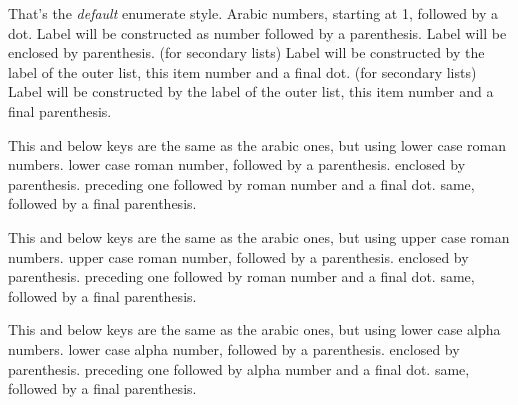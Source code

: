 \documentclass[dctools,english,tocdepth=3,secdepth=3]{ufrgscca} %
\begin{document}
\begin{Keys}


	 That's the \emph{default} enumerate style. Arabic numbers, starting at 1, followed by a dot.
	 Label will be constructed as number followed by a parenthesis.
	 Label will be enclosed by parenthesis.
	 (for secondary lists) Label will be constructed by the label of the outer list, this item number and a final dot.
	 (for secondary lists) Label will be constructed by the label of the outer list, this item number and a final parenthesis.

	 This and below keys are the same as the arabic ones, but using lower case roman numbers.
	 lower case roman number, followed by a parenthesis.
	 enclosed by parenthesis.
	 preceding one followed by roman number and a final dot.
	 same, followed by a final parenthesis.

	 This and below keys are the same as the arabic ones, but using upper case roman numbers.
	 upper case roman number, followed by a parenthesis.
	 enclosed by parenthesis.
	 preceding one followed by roman number and a final dot.
	 same, followed by a final parenthesis.

	 This and below keys are the same as the arabic ones, but using lower case alpha numbers.
	 lower case alpha number, followed by a parenthesis.
	 enclosed by parenthesis.
	 preceding one followed by alpha number and a final dot.
	 same, followed by a final parenthesis.


\end{Keys}
\end{document}
